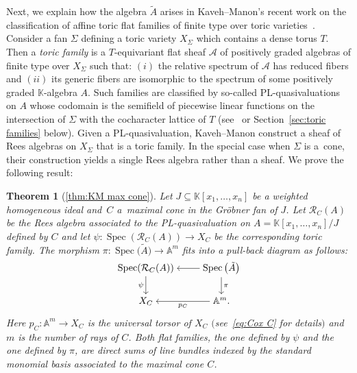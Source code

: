 \documentclass[10pt,a4paper]{amsart}
\newcommand{\thref}[1]{\ref{#1}}
\newtheorem{Theorem}{Theorem}[section]
\numberwithin{equation}{section}
\begin{document}
Next, we explain how the algebra $\tilde{A} $ arises in Kaveh--Manon's recent work on the classification of affine toric flat families of finite type over toric varieties~\cite{KM-toricbundles}.
Consider a fan $\Sigma$ defining a toric variety $X_\Sigma$ which contains a dense torus $T$.
Then a {\it toric family} is a $T$-equivariant flat sheaf $\mathcal A$ of positively graded algebras of finite type over $X_\Sigma$ such that: $(i)$ the relative spectrum of $\mathcal A$ has reduced fibers and $(ii)$ its generic fibers are isomorphic to the spectrum of some positively graded $\mathbb K$-algebra $A$.
Such families are classified by so-called PL-quasivaluations on $A$ whose codomain is the semifield of piecewise linear functions on the intersection of $\Sigma$ with the cocharacter lattice of $T$ (see~\cite[Section~1.1]{KM-toricbundles} or Section~\ref{sec:toric families} below).
Given a PL-quasivaluation, Kaveh--Manon construct a sheaf of Rees algebras on $X_\Sigma$ that is a toric family.
In the special case when $\Sigma$ is a~cone, their construction yields a single Rees algebra rather than a sheaf.
We prove the following result:

\begin{Theorem}[\thref{thm:KM max cone}]
Let $J\subseteq\mathbb K[{x_1,\dots,x_n}]$ be a weighted homogeneous ideal and~$C$ a~maximal cone in the Gr\"obner fan of $J$.
Let $\mathcal R_C(A)$ be the Rees algebra associated to the PL-quasivaluation on $A=\mathbb K[{x_1,\dots,x_n}]/J$ defined by $C$ and let $\psi\colon \operatorname{Spec}(\mathcal R_C(A))\to X_C$ be the corresponding toric family.
The morphism $\pi\colon \operatorname{Spec}\big(\tilde A\big)\to \mathbb A^m$ fits into a pull-back diagram as follows:
 \begin{displaymath}
 \begin{tikzcd}[ampersand replacement=\&,cramped]
 \operatorname{Spec}(\mathcal R_C (A))\ar[d,"\psi"'] \&
 \operatorname{Spec}\big(\tilde A\big)\ar[d,"\pi"] \ar[l]\\
 X_{C}\& \mathbb A^m. \ar[l,"p_C"]
 \end{tikzcd}
 \end{displaymath}
Here $p_C\colon \mathbb A^m\to X_C$ is the universal torsor of $X_C$ $($see~\eqref{eq:Cox C} for details$)$ and $m$ is the number of rays of $C$.
Both flat families, the one defined by $\psi$ and the one defined by $\pi$, are direct sums of line bundles indexed by the standard monomial basis associated to the maximal cone $C$.
\end{Theorem}
\end{document}
